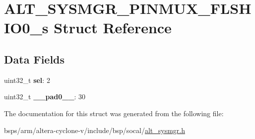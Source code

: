\hypertarget{structALT__SYSMGR__PINMUX__FLSHIO0__s}{}\section{A\+L\+T\+\_\+\+S\+Y\+S\+M\+G\+R\+\_\+\+P\+I\+N\+M\+U\+X\+\_\+\+F\+L\+S\+H\+I\+O0\+\_\+s Struct Reference}
\label{structALT__SYSMGR__PINMUX__FLSHIO0__s}
\subsection*{Data Fields}
\begin{DoxyCompactItemize}
\item 
\mbox{\label{structALT__SYSMGR__PINMUX__FLSHIO0__s_a9f279f199473c2871a85c59fccb0bc7f}} 
uint32\+\_\+t {\bfseries sel}\+: 2
\item 
\mbox{\label{structALT__SYSMGR__PINMUX__FLSHIO0__s_a9e1ae8dd8eb3c06542fab2ee0fc26b4c}} 
uint32\+\_\+t {\bfseries \+\_\+\+\_\+pad0\+\_\+\+\_\+}\+: 30
\end{DoxyCompactItemize}


The documentation for this struct was generated from the following file\+:\begin{DoxyCompactItemize}
\item 
bsps/arm/altera-\/cyclone-\/v/include/bsp/socal/\mbox{\hyperlink{alt__sysmgr_8h}{alt\+\_\+sysmgr.\+h}}\end{DoxyCompactItemize}
